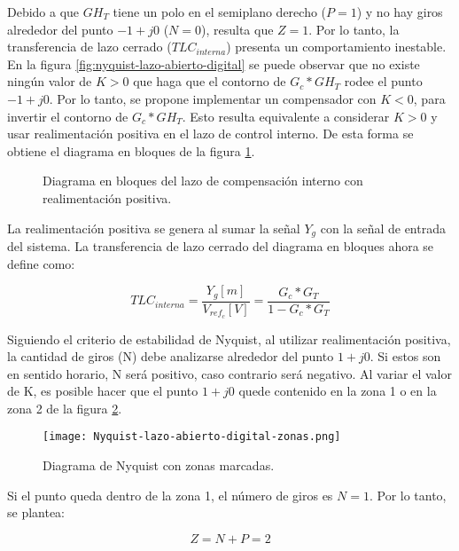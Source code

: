 Debido a que $GH_T$ tiene un polo en el semiplano derecho ($P=1$) y no hay giros alrededor del punto $-1+j0$ ($N=0$), resulta que $Z=1$. Por lo tanto, la transferencia de lazo cerrado ($TLC_{interna}$) presenta un comportamiento inestable. En la figura \ref{fig:nyquist-lazo-abierto-digital} se puede observar que no existe ningún valor de $K>0$ que haga que el contorno de $G_c*GH_T$ rodee el punto $-1+j0$. Por lo tanto, se propone implementar un compensador con $K<0$, para invertir el contorno de $G_c*GH_T$. Esto resulta equivalente a considerar $K>0$ y usar realimentación positiva en el lazo de control interno. De esta forma se obtiene el diagrama en bloques de la figura \ref{fig:diag-interno_dig_realimentacion_positiva}.


\begin{figure}[H]
	\centering
	
	\caption{Diagrama en bloques del lazo de compensación interno con realimentación positiva.}	\label{fig:diag-interno_dig_realimentacion_positiva}
\end{figure}

La realimentación positiva se genera al sumar la señal $Y_g$ con la señal de entrada del sistema. La transferencia de lazo cerrado del diagrama en bloques ahora se define como:

\begin{equation}
	TLC_{interna}=\frac{Y_g[m]}{V_{ref_c}[V]}=\frac{G_c*G_T}{1-G_c*G_T}
\end{equation}

Siguiendo el criterio de estabilidad de Nyquist, al utilizar realimentación positiva, la cantidad de giros (N) debe analizarse alrededor del punto $1+j0$. Si estos son en sentido horario, N será positivo, caso contrario será negativo. Al variar el valor de K, es posible hacer que el punto $1+j0$ quede contenido en la zona 1 o en la zona 2 de la figura \ref{fig:nyquist-con-zonas_digital}. 

\begin{figure}[H]
	\centering
	\texttt{[image: Nyquist-lazo-abierto-digital-zonas.png]}
	\caption{Diagrama de Nyquist con zonas marcadas.}
	\label{fig:nyquist-con-zonas_digital}
\end{figure}

Si el punto queda dentro de la zona 1, el número de giros es $N=1$. Por lo tanto, se plantea:

\begin{equation*}
	Z = N + P = 2
\end{equation*}



